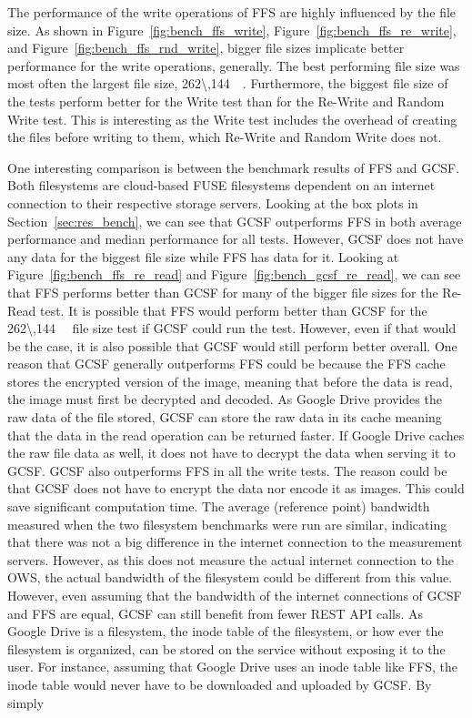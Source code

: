 The performance of the write operations of \gls{FFS} are highly influenced by the file size. As shown in Figure~\ref{fig:bench_ffs_write}, Figure~\ref{fig:bench_ffs_re_write}, and Figure~\ref{fig:bench_ffs_rnd_write}, bigger file sizes implicate better performance for the write operations, generally. The best performing file size was most often the largest file size, \SI[per-mode = symbol]{262\,144}{\kilo\byte}. Furthermore, the biggest file size of the tests perform better for the Write test than for the \mbox{Re-Write} and Random Write test. This is interesting as the Write test includes the overhead of creating the files before writing to them, which \mbox{Re-Write} and Random Write does not.

One interesting comparison is between the benchmark results of \gls{FFS} and \gls{GCSF}. Both filesystems are \mbox{cloud-based} \gls{FUSE} filesystems dependent on an internet connection to their respective storage servers. Looking at the box plots in Section~\ref{sec:res_bench}, we can see that \gls{GCSF} outperforms \gls{FFS} in both average performance and median performance for all tests. However, \gls{GCSF} does not have any data for the biggest file size while \gls{FFS} has data for it. Looking at Figure~\ref{fig:bench_ffs_re_read} and Figure~\ref{fig:bench_gcsf_re_read}, we can see that \gls{FFS} performs better than \gls{GCSF} for many of the bigger file sizes for the \mbox{Re-Read} test. It is possible that \gls{FFS} would perform better than \gls{GCSF} for the \SI{262\,144}{\kilo\byte} file size test if \gls{GCSF} could run the test. However, even if that would be the case, it is also possible that \gls{GCSF} would still perform better overall. One reason that \gls{GCSF} generally outperforms \gls{FFS} could be because the \gls{FFS} cache stores the encrypted version of the image, meaning that before the data is read, the image must first be decrypted and decoded. As Google Drive provides the raw data of the file stored, \gls{GCSF} can store the raw data in its cache meaning that the data in the read operation can be returned faster. If Google Drive caches the raw file data as well, it does not have to decrypt the data when serving it to \gls{GCSF}. \gls{GCSF} also outperforms \gls{FFS} in all the write tests. The reason could be that \gls{GCSF} does not have to encrypt the data nor encode it as images. This could save significant computation time. The average (reference point) bandwidth measured when the two filesystem benchmarks were run are similar, indicating that there was not a big difference in the internet connection to the measurement servers. However, as this does not measure the actual internet connection to the \gls{OWS}, the actual bandwidth of the filesystem could be different from this value. However, even assuming that the bandwidth of the internet connections of \gls{GCSF} and \gls{FFS} are equal, \gls{GCSF} can still benefit from fewer REST \gls{API} calls. As Google Drive is a filesystem, the inode table of the filesystem, or how ever the filesystem is organized, can be stored on the service without exposing it to the user. For instance, assuming that Google Drive uses an inode table like \gls{FFS}, the inode table would never have to be downloaded and uploaded by \gls{GCSF}. By simply 